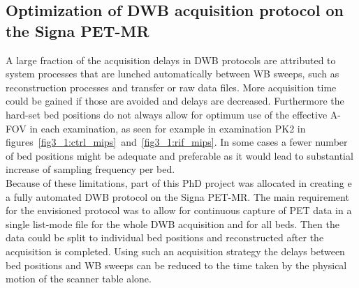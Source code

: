 \subsection{Optimization of DWB acquisition protocol on the Signa PET-MR}
A large fraction of the acquisition delays in DWB protocols are attributed to system processes that are lunched automatically between WB sweeps, such as reconstruction processes and transfer or raw data files. More acquisition time could be gained if those are avoided and delays are decreased. Furthermore the hard-set bed positions do not always allow for optimum use of the effective A-FOV in each examination, as seen for example in examination PK2 in figures~\ref{fig3_1:ctrl_mips}~and~\ref{fig3_1:rif_mips}. In some cases a fewer number of bed positions might be adequate and preferable as it would lead to substantial increase of sampling frequency per bed. \\
Because of these limitations, part of this PhD project was allocated in creating e a fully automated DWB protocol on the Signa PET-MR. The main requirement for the envisioned protocol was to allow for continuous capture of PET data in a single list-mode file for the whole DWB acquisition and for all beds. Then the data could be split to individual bed positions and reconstructed after the acquisition is completed. Using such an acquisition strategy the delays between bed positions and WB sweeps can be reduced to the time taken by the physical motion of the scanner table alone. \\

